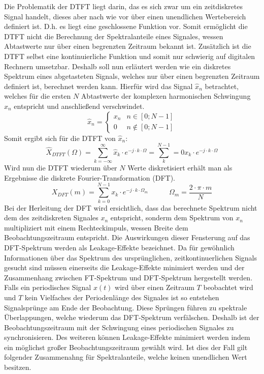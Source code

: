Die Problematik der DTFT liegt darin, das es sich zwar um ein zeitdiskretes Signal handelt, dieses aber nach wie vor über einen unendlichen Wertebereich definiert ist. D.h. es liegt eine geschlossene Funktion vor. Somit ermöglicht die DTFT nicht die Berechnung der Spektralanteile eines Signales, wessen Abtastwerte nur über einen begrenzten Zeitraum bekannt ist. Zusätzlich ist die DTFT selbst eine kontinuierliche Funktion und somit nur schwierig auf digitalen Rechnern umsetzbar. Deshalb soll nun erläutert werden wie ein diskretes Spektrum eines abgetasteten Signals, welches nur über einen begrenzten Zeitraum definiert ist, berechnet werden kann. Hierfür wird das Signal $\hat{x}_n$ betrachtet, welches für die ersten $N$ Abtastwerte der komplexen harmonischen Schwingung $x_n$ entspricht und anschließend verschwindet.
\begin{equation}
\hat{x}_n = \begin{cases}
				x_n & n \in [0;N-1] \\
				0   & n \not\in [0;N-1]
				\end{cases}
\end{equation}
Somit ergibt sich für die DTFT von $\hat{x}_n$:
\begin{equation}
\hat{X}_{DTFT}(\Omega) = \sum^{\infty}_{k=-\infty}\hat{x}_k \cdot e^{-j\cdot k \cdot \Omega} = \sum^{N-1}_k=0 x_k \cdot e^{-j \cdot k \cdot \Omega}
\end{equation}
Wird nun die DTFT wiederum über $N$ Werte diskretisiert erhält man als Ergebnisse die diskrete Fourier-Transformation (DFT).
\begin{equation}
X_{DFT}(m) = \sum^{N-1}_{k=0} x_k \cdot e^{-j\cdot k \cdot \Omega_m} \hspace{35pt} \Omega_m = \frac{2\cdot \pi \cdot m}{N}
\end{equation}
Bei der Herleitung der DFT wird ersichtlich, dass das berechnete Spektrum nicht dem des zeitdiskreten Signales $x_n$ entspricht, sonderm dem Spektrum von $x_n$ multipliziert mit einem Rechteckimpuls, wessen Breite dem Beobachtungszeitraum entspricht. Die Auswirkungen dieser Fensterung auf das DFT-Spektrum werden als Leakage-Effekte bezeichnet. Da für gewöhnlich Informationen über das Spektrum des ursprünglichen, zeitkontinuerlichen Signals gesucht sind müssen einerseits die Leakage-Effekte minimiert werden und der Zusammenhang zwischen FT-Spektrum und DFT-Spektrum hergestellt werden. Falls ein periodisches Signal $x(t)$ wird über einen Zeitraum $T$ beobachtet wird und $T$ kein Vielfaches der Periodenlänge des Signales ist so entstehen Signalsprünge am Ende der Beobachtung. Diese Sprüngen führen zu spektrale Überlappungen, welche wiederum das DFT-Spektrum verfälschen. Deshalb ist der Beobachtungszeitraum mit der Schwingung eines periodischen Signales zu synchronisieren. Des weiteren können Leakage-Effekte minimiert werden indem ein möglichst großer Beobachtungszeitraum gewählt wird. Ist dies der Fall gilt folgender Zusammenahng für Spektralanteile, welche keinen unendlichen Wert besitzen.
